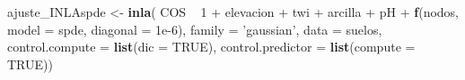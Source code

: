 \documentclass[11pt,b5paper,]{krantz}
\newenvironment{Shaded}{}{}
\newcommand{\KeywordTok}[1]{\textcolor[rgb]{0.00,0.44,0.13}{\textbf{#1}}}
\newcommand{\DataTypeTok}[1]{\textcolor[rgb]{0.56,0.13,0.00}{#1}}
\newcommand{\DecValTok}[1]{\textcolor[rgb]{0.25,0.63,0.44}{#1}}
\newcommand{\FloatTok}[1]{\textcolor[rgb]{0.25,0.63,0.44}{#1}}
\newcommand{\StringTok}[1]{\textcolor[rgb]{0.25,0.44,0.63}{#1}}
\newcommand{\OtherTok}[1]{\textcolor[rgb]{0.00,0.44,0.13}{#1}}
\newcommand{\OperatorTok}[1]{\textcolor[rgb]{0.40,0.40,0.40}{#1}}
\newcommand{\NormalTok}[1]{#1}
\begin{document}
\begin{Shaded}
\begin{Highlighting}[]
\NormalTok{ajuste_INLAspde <-}\StringTok{ }\KeywordTok{inla}\NormalTok{(}
\NormalTok{  COS }\OperatorTok{~}\StringTok{ }\DecValTok{1} \OperatorTok{+}\StringTok{ }\NormalTok{elevacion }\OperatorTok{+}\StringTok{ }\NormalTok{twi }\OperatorTok{+}\StringTok{ }\NormalTok{arcilla }\OperatorTok{+}\StringTok{ }\NormalTok{pH }\OperatorTok{+}
\StringTok{    }\KeywordTok{f}\NormalTok{(nodos, }\DataTypeTok{model =}\NormalTok{ spde, }\DataTypeTok{diagonal =} \FloatTok{1e-6}\NormalTok{),}
  \DataTypeTok{family =} \StringTok{'gaussian'}\NormalTok{,}
  \DataTypeTok{data =}\NormalTok{ suelos,}
  \DataTypeTok{control.compute =} \KeywordTok{list}\NormalTok{(}\DataTypeTok{dic =} \OtherTok{TRUE}\NormalTok{),}
  \DataTypeTok{control.predictor =} \KeywordTok{list}\NormalTok{(}\DataTypeTok{compute =} \OtherTok{TRUE}\NormalTok{))}


\end{Highlighting}
\end{Shaded}
\end{document}
